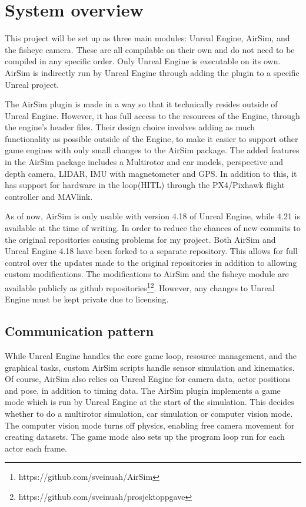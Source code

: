 \section{System overview}

This project will be set up as three main modules: Unreal Engine, AirSim, and the fisheye camera. These are all compilable on their own and do not need to be compiled in any specific order. Only Unreal Engine is executable on its own. AirSim is indirectly run by Unreal Engine through adding the plugin to a specific Unreal project.

The AirSim plugin is made in a way so that it technically resides outside of Unreal Engine. However, it has full access to the resources of the Engine, through the engine's header files. Their design choice involves adding as much functionality as possible outside of the Engine, to make it easier to support other game engines with only small changes to the AirSim package. The added features in the AirSim package includes a Multirotor and car models, perspective and depth camera, LIDAR, IMU with magnetometer and GPS. In addition to this, it has support for hardware in the loop(HITL) through the PX4/Pixhawk flight controller and MAVlink. 

As of now, AirSim is only usable with version 4.18 of Unreal Engine, while 4.21 is available at the time of writing. In order to reduce the chances of new commits to the original repositories causing problems for my project. Both AirSim and Unreal Engine 4.18 have been forked to a separate repository. This allows for full control over the updates made to the original repositories in addition to allowing custom modifications. The modifications to AirSim and the fisheye module are available publicly as github repositories\footnote{https://github.com/sveinuah/AirSim}\footnote{https://github.com/sveinuah/prosjektoppgave}. However, any changes to Unreal Engine must be kept private due to licensing.

\subsection{Communication pattern}

While Unreal Engine handles the core game loop, resource management, and the graphical tasks, custom AirSim scripts handle sensor simulation and kinematics. Of course, AirSim also relies on Unreal Engine for camera data, actor positions and pose, in addition to timing data. The AirSim plugin implements a game mode which is run by Unreal Engine at the start of the simulation. This decides whether to do a multirotor simulation, car simulation or computer vision mode. The computer vision mode turns off physics, enabling free camera movement for creating datasets. The game mode also sets up the program loop run for each actor each frame.

